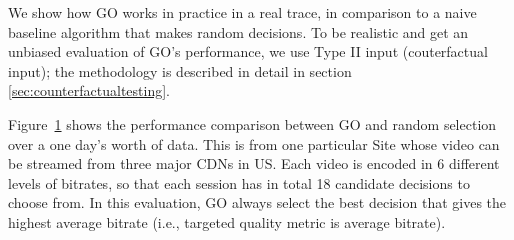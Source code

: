 \begin{figure}[t!]
\centering
{}
\label{fig:counterfactual}
\end{figure}


We show how GO works in practice in a real trace, in comparison to a naive baseline algorithm that makes random decisions.  To be realistic and get an unbiased evaluation of GO's performance, we use Type II input (couterfactual input); the methodology is described in detail in section \ref{sec:counterfactualtesting}. 

Figure~\ref{fig:counterfactual} shows the performance comparison between GO and random selection over a one day's worth of data. This is from one particular Site whose video can be streamed from three major CDNs in US. Each video is encoded in 6 different levels of bitrates, so that each session has in total 18 candidate decisions to choose from. In this evaluation, GO always select the best decision that gives the highest average bitrate (i.e., targeted quality metric is average bitrate).

